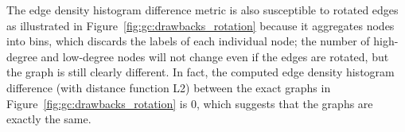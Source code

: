 The edge density histogram difference metric is also susceptible to rotated 
edges as illustrated in Figure~\ref{fig:gc:drawbacks_rotation} because it 
aggregates nodes into bins, which discards the labels of each individual node; 
the number of high-degree and low-degree nodes 
will not change even if the edges are rotated, but the graph is still clearly 
different. In fact, the computed edge density histogram difference (with 
distance function L2) between the exact graphs in 
Figure~\ref{fig:gc:drawbacks_rotation} is 0, which suggests that the graphs are 
exactly the same.